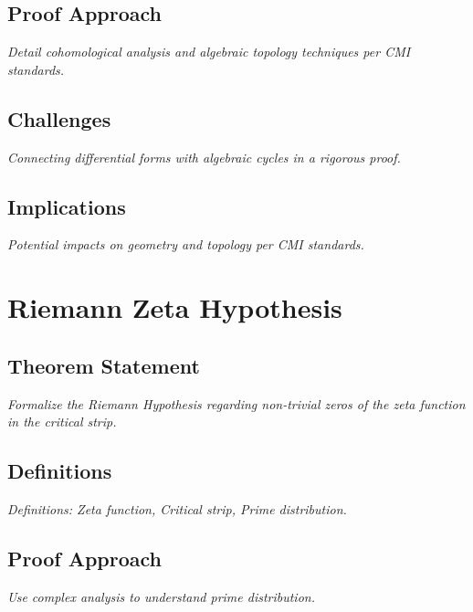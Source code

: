 \documentclass[12pt, a4paper]{article}
\begin{document}
\subsection{Proof Approach}
\textit{Detail cohomological analysis and algebraic topology techniques per CMI standards.}

\subsection{Challenges}
\textit{Connecting differential forms with algebraic cycles in a rigorous proof.}

\subsection{Implications}
\textit{Potential impacts on geometry and topology per CMI standards.}


\section{Riemann Zeta Hypothesis}
\subsection{Theorem Statement}
\begin{theorem}
\label{thm:riemann}
\textit{Formalize the Riemann Hypothesis regarding non-trivial zeros of the zeta function in the critical strip.}
\end{theorem}

\subsection{Definitions}
\textit{Definitions: Zeta function, Critical strip, Prime distribution.}

\subsection{Proof Approach}
\textit{Use complex analysis to understand prime distribution.}
\end{document}
